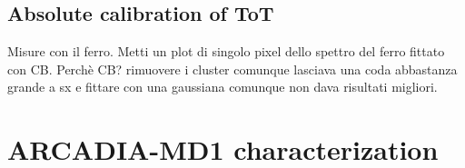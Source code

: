     \subsection{Absolute calibration of ToT}
    Misure con il ferro. Metti un plot di singolo pixel dello spettro del ferro fittato con CB. Perchè CB? rimuovere i cluster comunque lasciava una coda abbastanza grande a sx e fittare con una gaussiana comunque non dava risultati migliori. 
    



\section{ARCADIA-MD1 characterization}
